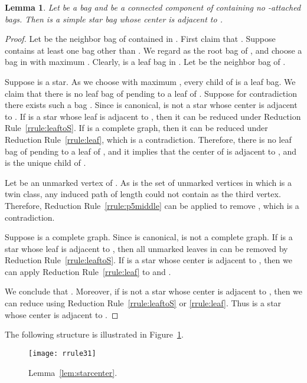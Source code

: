 \documentclass[11pt]{elsarticle}
\newtheorem{lemma}[theorem]{Lemma}
\begin{document}
\begin{lemma}
\label{lem:smallbranch}
Let  be a bag and  be a connected component of  containing no -attached bags.
Then  is a simple star bag whose center is adjacent to .
\end{lemma}
\begin{proof}
Let  be the neighbor bag of  contained in .
First claim that . Suppose  contains at least one bag other than .
We regard  as the root bag of , and choose a bag  in  with maximum . 
Clearly,  is a leaf bag in .
Let  be the neighbor bag of .


Suppose  is a star.
As we choose  with maximum , 
every child of  is a leaf bag.
We claim that there is no leaf bag of  pending to a leaf of .
Suppose for contradiction there exists such a bag .
Since  is canonical,  is not a star whose center is adjacent to .
If  is a star whose leaf is adjacent to , then it can be reduced under Reduction Rule~\ref{rrule:leaftoS}.
If  is a complete graph, then it can be reduced under Reduction Rule~\ref{rrule:leaf}, 
which is a contradiction. 
Therefore, there is no leaf bag of  pending to a leaf of , 
and it implies that 
the center of  is adjacent to , and
 is the unique child of .

Let  be an unmarked vertex of . As  is the set of unmarked vertices in  which is a twin class, 
any induced path of length  could not contain  as the third vertex.
Therefore, Reduction Rule~\ref{rrule:p5middle} can be applied to remove , which is a contradiction.


Suppose  is a complete graph.
Since  is canonical,  is not a complete graph.
If  is a star whose leaf is adjacent to , 
then all unmarked leaves in  can be removed by Reduction Rule~\ref{rrule:leaftoS}.
If  is a star whose center is adjacent to , then 
we can apply Reduction Rule~\ref{rrule:leaf} to  and .

We conclude that . Moreover, if  is not a star whose center is adjacent to , then we can reduce  using Reduction Rule~\ref{rrule:leaftoS} or \ref{rrule:leaf}.
Thus  is a star whose center is adjacent to .
\end{proof}

The following structure is illustrated in Figure~\ref{fig:rrule2}.



  \begin{figure}[t]
      \centering
      \texttt{[image: rrule31]}
\caption{Lemma~\ref{lem:starcenter}.} \label{fig:rrule2}
  \end{figure}
  
\end{document}
